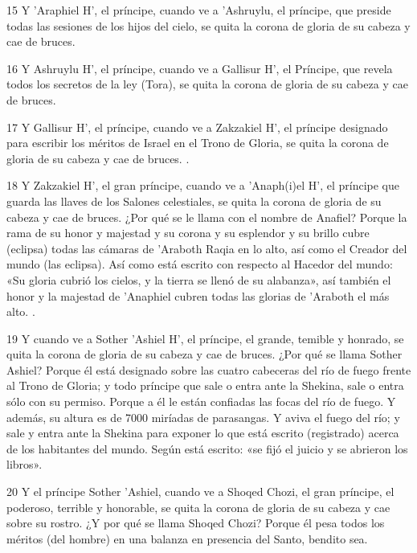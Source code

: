 \par 15 Y 'Araphiel H', el príncipe, cuando ve a 'Ashruylu, el príncipe, que preside todas las sesiones de los hijos del cielo, se quita la corona de gloria de su cabeza y cae de bruces.

\par 16 Y Ashruylu H', el príncipe, cuando ve a Gallisur H', el Príncipe, que revela todos los secretos de la ley (Tora), se quita la corona de gloria de su cabeza y cae de bruces.

\par 17 Y Gallisur H', el príncipe, cuando ve a Zakzakiel H', el príncipe designado para escribir los méritos de Israel en el Trono de Gloria, se quita la corona de gloria de su cabeza y cae de bruces. .

\par 18 Y Zakzakiel H', el gran príncipe, cuando ve a 'Anaph(i)el H', el príncipe que guarda las llaves de los Salones celestiales, se quita la corona de gloria de su cabeza y cae de bruces. ¿Por qué se le llama con el nombre de Anafiel? Porque la rama de su honor y majestad y su corona y su esplendor y su brillo cubre (eclipsa) todas las cámaras de 'Araboth Raqia en lo alto, así como el Creador del mundo (las eclipsa). Así como está escrito con respecto al Hacedor del mundo: «Su gloria cubrió los cielos, y la tierra se llenó de su alabanza», así también el honor y la majestad de 'Anaphiel cubren todas las glorias de 'Araboth el más alto. .

\par 19 Y cuando ve a Sother 'Ashiel H', el príncipe, el grande, temible y honrado, se quita la corona de gloria de su cabeza y cae de bruces. ¿Por qué se llama Sother Ashiel? Porque él está designado sobre las cuatro cabeceras del río de fuego frente al Trono de Gloria; y todo príncipe que sale o entra ante la Shekina, sale o entra sólo con su permiso. Porque a él le están confiadas las focas del río de fuego. Y además, su altura es de 7000 miríadas de parasangas. Y aviva el fuego del río; y sale y entra ante la Shekina para exponer lo que está escrito (registrado) acerca de los habitantes del mundo. Según está escrito: «se fijó el juicio y se abrieron los libros».

\par 20 Y el príncipe Sother 'Ashiel, cuando ve a Shoqed Chozi, el gran príncipe, el poderoso, terrible y honorable, se quita la corona de gloria de su cabeza y cae sobre su rostro. ¿Y por qué se llama Shoqed Chozi? Porque él pesa todos los méritos (del hombre) en una balanza en presencia del Santo, bendito sea.

